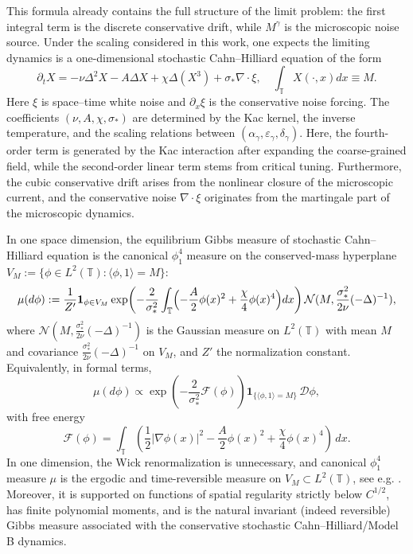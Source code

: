 \documentclass{article}
\begin{document}
This formula already contains the full structure of the limit problem:
the first integral term is the discrete conservative drift, while \(M^\gamma\) is the microscopic noise source.
Under the scaling considered in this work, one expects the limiting dynamics is a one-dimensional stochastic Cahn--Hilliard equation of the form
\begin{equation}
\partial_t X
=
-\nu \Delta^2 X
- A \Delta X
+ \chi \Delta(X^3)
+ \sigma_{*}\nabla\cdot\xi, \quad \int_{\mathbb T} X(\cdot,x) dx \equiv M.
\end{equation}
Here $\xi$ is space--time white noise and $\partial_x\xi$ is the conservative noise forcing.
The coefficients $(\nu,A,\chi,\sigma_*)$ are determined by the Kac kernel, the inverse temperature, and the scaling relations between $(\alpha_\gamma,\varepsilon_\gamma,\delta_\gamma)$.
Here, the fourth-order term is generated by the Kac interaction after expanding the coarse-grained field, while the second-order linear term stems from critical tuning. Furthermore, the cubic conservative drift arises from the nonlinear closure of the microscopic current, and the conservative noise $\nabla \cdot\xi$ originates from the martingale part of the microscopic dynamics.

In one space dimension, the equilibrium Gibbs measure of stochastic Cahn--Hilliard equation is the canonical \(\phi^4_1\) measure on the conserved-mass hyperplane \(V_M := \{ \phi \in L^2(\mathbb T): \langle \phi, 1 \rangle = M\}\):
\begin{equation}\label{phi41law}
    \mu (d\phi) :=
\frac{1}{Z'} \mathbf{1}_{\phi \in V_M} \exp\!\left(
-\frac{2}{\sigma_*^2} \int_{\mathbb T}
\Bigl( -\frac{A}{2}\phi(x)^2+\frac{\chi}{4}\phi(x)^4 \Bigr)dx
\right)
\mathcal{N}(M, \frac{\sigma_*^2}{2 \nu}(-\Delta)^{-1}),
\end{equation}
where $\mathcal{N}(M, \frac{\sigma_*^2}{2 \nu}(-\Delta)^{-1})$ is the Gaussian measure on $L^2(\mathbb T)$ with mean \(M\) and covariance \(\frac{\sigma_*^2}{2\nu}(-\Delta)^{-1}\) on $V_M$, and $Z'$ the normalization constant. 
Equivalently, in formal terms,
\[
\mu(d\phi)\propto
\exp\!\left(
-\frac{2}{\sigma_*^2}\mathcal F(\phi) \right)\mathbf 1_{\{ \langle \phi,1\rangle=M\}}\,\mathcal D \phi,
\]
with free energy
\[
\mathcal F(\phi)
=
\int_{\mathbb T}
\left(
\frac12| \nabla \phi(x)|^2 -\frac{A}{2}\phi(x)^2 +\frac{\chi}{4}\phi(x)^4 \right)\,dx.
\]
In one dimension, the Wick renormalization is unnecessary, and canonical \(\phi^4_1\) measure \(\mu\) is the ergodic and time-reversible measure on \(V_M \subset L^2(\mathbb T)\), see e.g. \cite{Fu91}. Moreover, it is supported on functions of spatial regularity strictly below \(C^{1/2}\), has finite polynomial moments, and is the natural invariant (indeed reversible) Gibbs measure associated with the conservative stochastic Cahn--Hilliard/Model B dynamics.
\end{document}

